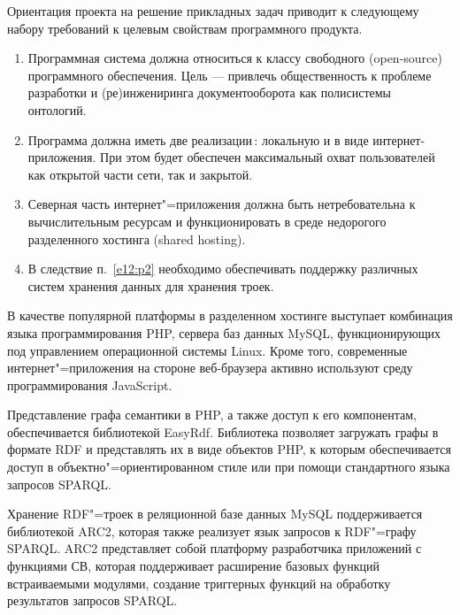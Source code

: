 \documentclass[utf8]{../IncArticle}
\begin{document}
Ориентация проекта на решение прикладных задач приводит к следующему
набору требований к целевым свойствам программного продукта.
\begin{enumerate}
\item Программная система должна относиться к классу свободного
  (open-source) программного обеспечения. Цель --- привлечь
  общественность к проблеме разработки и (ре)инжениринга
  документооборота как полисистемы онтологий.
\item Программа должна иметь две реализации\,: локальную и в виде
  интернет-приложения. При этом будет обеспечен максимальный охват
  пользователей как открытой части сети, так и закрытой.
\item Северная часть интернет"=приложения должна быть нетребовательна
  к вычислительным ресурсам и функционировать в среде недорогого
  разделенного хостинга (shared hosting).  \label{e12:p2}
\item В следствие п.~\ref{e12:p2} необходимо обеспечивать поддержку
  различных систем хранения данных для хранения троек.
\end{enumerate}
В качестве популярной платформы в разделенном хостинге выступает
комбинация языка программирования PHP, сервера баз данных MySQL,
функционирующих под управлением операционной системы Linux.  Кроме
того, современные интернет"=приложения на стороне веб-браузера активно
используют среду программирования JavaScript.

Представление графа семантики в PHP, а также доступ к его компонентам,
обеспечивается библиотекой EasyRdf.  Библиотека позволяет загружать
графы в формате RDF и представлять их в виде
объектов PHP, к которым обеспечивается доступ в
объектно"=ориентированном стиле или при помощи стандартного языка
запросов SPARQL.

Хранение RDF"=троек в реляционной базе данных MySQL поддерживается
библиотекой ARC2, которая также реализует язык запросов к
RDF"=графу SPARQL.  ARC2 представляет собой платформу разработчика
приложений с функциями СВ, которая поддерживает расширение базовых
функций встраиваемыми модулями, создание триггерных функций на
обработку результатов запросов SPARQL.

\end{document}
